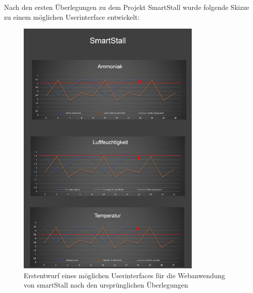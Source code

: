 \documentclass[conference]{IEEEtran}
\begin{document}
Nach den ersten Überlegungen zu dem Projekt SmartStall wurde folgende Skizze zu einem möglichen Userinterface entwickelt:
\begin{figure}[H]
	\centering
	\includegraphics[width=90mm]{fig/firstUI.JPG}
	\caption{Erstentwurf eines möglichen Userinterfaces für die Webanwendung von smartStall nach den ursprünglichen Überlegungen}
	\label{firstUI}
\end{figure}
\end{document}
